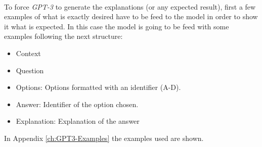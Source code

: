 \paragraph{}
To force \emph{GPT-3} to generate the explanations (or any expected result), first a few examples of what is exactly desired have to be feed to the model in order to show it what is expected. In this case the model is going to be feed with some examples following the next structure:
\begin{itemize}
	\item Context
	\item Question
	\item Options: Options formatted with an identifier (A-D).
	\item Answer: Identifier of the option chosen. 
	\item Explanation: Explanation of the answer
\end{itemize}
In Appendix \ref{ch:GPT3-Examples} the examples used are shown.
\paragraph{}
